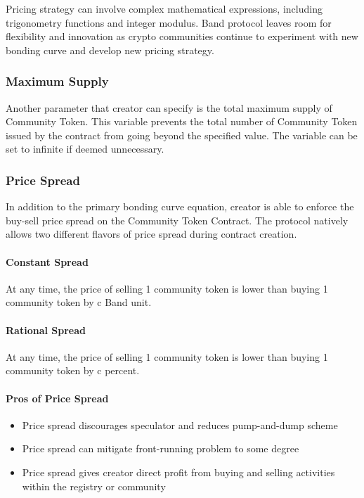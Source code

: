 \documentclass[letterpaper,11pt]{article}
\begin{document}
Pricing strategy can involve complex mathematical expressions, including trigonometry functions and integer modulus. Band protocol leaves room for flexibility and innovation as crypto communities continue to experiment with new bonding curve and develop new pricing strategy. 


\subsubsection{Maximum Supply} \label{sec:max-supply}
Another parameter that creator can specify is the total maximum supply of Community Token. This variable prevents the total number of Community Token issued by the contract from going beyond the specified value. The variable can be set to infinite if deemed unnecessary.

\subsubsection{Price Spread} \label{sec:px-spread}
In addition to the primary bonding curve equation, creator is able to enforce the buy-sell price spread on the Community Token Contract. The protocol natively allows two different flavors of price spread during contract creation. 

\paragraph{Constant Spread} At any time, the price of selling 1 community token is lower than buying 1 community token by c Band unit.
\paragraph{Rational Spread} At any time, the price of selling 1 community token is lower than buying 1 community token by c percent.

\paragraph{Pros of Price Spread}
\begin{itemize}
\setlength\itemsep{0em}
\item Price spread discourages speculator and reduces pump-and-dump scheme
\item Price spread can mitigate front-running problem to some degree 
\item Price spread gives creator direct profit from buying and selling activities within the registry or community
\end{itemize}
\end{document}
